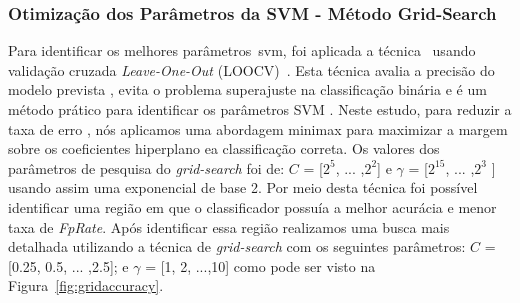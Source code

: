 \subsubsection{Otimização dos Parâmetros da SVM - Método Grid-Search}

Para identificar os melhores parâmetros~\ac{svm}, foi aplicada a técnica~\cite{gridsearchsvm2010} usando validação cruzada \textit{Leave-One-Out} (LOOCV)~\cite{datamining2005}. Esta técnica avalia a precisão do modelo prevista , evita o problema superajuste na classificação binária e é um método prático para identificar os parâmetros SVM . Neste estudo, para reduzir a taxa de erro , nós aplicamos uma abordagem minimax para maximizar a margem sobre os coeficientes hiperplano ea classificação correta. Os valores dos parâmetros de pesquisa do \textit{grid-search} foi de: $C$ = [$2^5$, ... ,$2^2$] e $\gamma$ = [$2^{15}$, ... ,$2^3$ ] usando assim uma exponencial de base 2. Por meio desta técnica foi possível identificar uma região em que o classificador possuía a melhor acurácia e menor taxa de \textit{FpRate}. Após identificar essa região realizamos uma busca mais detalhada utilizando a técnica de \textit{grid-search} com os seguintes parâmetros: $C$ = [0.25, 0.5, ... ,2.5]; e $\gamma$ = [1, 2, ...,10] como 
pode ser visto na Figura~\ref{fig:gridaccuracy}.



